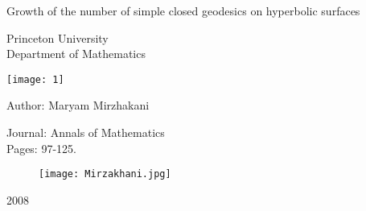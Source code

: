 \documentclass[10pt, oneside]{book}
\begin{document}
	\begin{titlepage}
		\center
		\begin{large}
			\Huge{Growth of the number of simple closed geodesics on hyperbolic surfaces}
		\end{large}
		
		\vspace{2.5cm}
		
		\LARGE{Princeton University}\\
		\large{Department of Mathematics}
		
		\vspace{5mm}
		
		\texttt{[image: 1]}
		
		\vspace{3cm}
		
		\begin{minipage}{.5\textwidth}
			Author: Maryam Mirzhakani\\
		\end{minipage}
		\hfill
		\begin{minipage}{.45\textwidth}
			\flushright
			Journal: Annals of Mathematics\\
			Pages: 97-125.
		\end{minipage}
		
		\begin{figure}[H]
			\centering
			\texttt{[image: Mirzakhani.jpg]}
		\end{figure}
		
		\vspace{2.5cm}
		
		\huge{2008}
	\end{titlepage}
	
\end{document}

